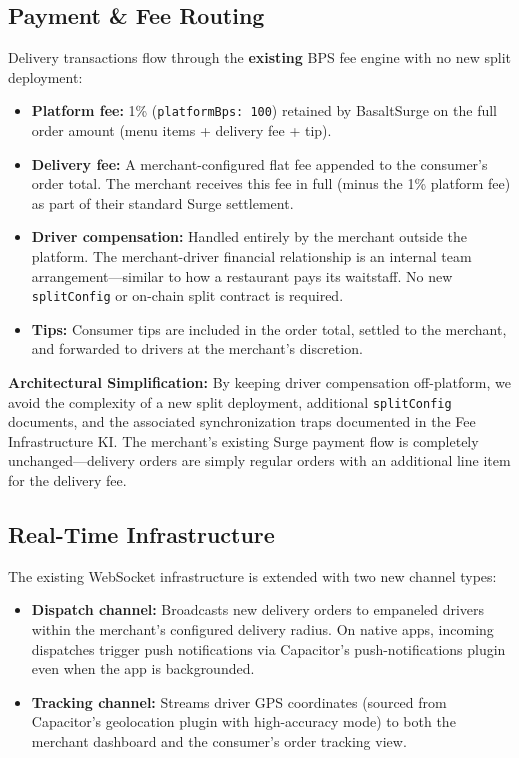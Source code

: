 \documentclass[11pt, letterpaper]{article}
\begin{document}
\subsection{Payment \& Fee Routing}
Delivery transactions flow through the \textbf{existing} BPS fee engine with no new split deployment:
\begin{itemize}
    \item \textbf{Platform fee:} 1\% (\texttt{platformBps: 100}) retained by BasaltSurge on the full order amount (menu items + delivery fee + tip).
    \item \textbf{Delivery fee:} A merchant-configured flat fee appended to the consumer's order total. The merchant receives this fee in full (minus the 1\% platform fee) as part of their standard Surge settlement.
    \item \textbf{Driver compensation:} Handled entirely by the merchant outside the platform. The merchant-driver financial relationship is an internal team arrangement---similar to how a restaurant pays its waitstaff. No new \texttt{splitConfig} or on-chain split contract is required.
    \item \textbf{Tips:} Consumer tips are included in the order total, settled to the merchant, and forwarded to drivers at the merchant's discretion.
\end{itemize}

\begin{recommendbox}
\textbf{Architectural Simplification:} By keeping driver compensation off-platform, we avoid the complexity of a new split deployment, additional \texttt{splitConfig} documents, and the associated synchronization traps documented in the Fee Infrastructure KI. The merchant's existing Surge payment flow is completely unchanged---delivery orders are simply regular orders with an additional line item for the delivery fee.
\end{recommendbox}

\subsection{Real-Time Infrastructure}
The existing WebSocket infrastructure is extended with two new channel types:
\begin{itemize}
    \item \textbf{Dispatch channel:} Broadcasts new delivery orders to empaneled drivers within the merchant's configured delivery radius. On native apps, incoming dispatches trigger push notifications via Capacitor's push-notifications plugin even when the app is backgrounded.
    \item \textbf{Tracking channel:} Streams driver GPS coordinates (sourced from Capacitor's geolocation plugin with high-accuracy mode) to both the merchant dashboard and the consumer's order tracking view.
\end{itemize}
\end{document}
